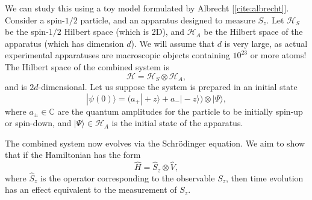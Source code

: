 \documentclass[pra,12pt]{revtex4-2}
\begin{document}
We can study this using a toy model formulated by Albrecht
[\ref{cite:albrecht}].  Consider a spin-$1/2$ particle, and an
apparatus designed to measure $S_z$.  Let $\mathscr{H}_S$ be the
spin-$1/2$ Hilbert space (which is 2D), and $\mathscr{H}_A$ be the
Hilbert space of the apparatus (which has dimension $d$).  We will
assume that $d$ is very large, as actual experimental apparatuses are
macroscopic objects containing $10^{23}$ or more atoms!  The Hilbert
space of the combined system is
\begin{equation}
  \mathscr{H} = \mathscr{H}_S \otimes \mathscr{H}_A,
\end{equation}
and is $2d$-dimensional.  Let us suppose the system is prepared in an initial
state
\begin{equation}
  |\psi(0)\rangle = \Big(a_+ |\!+z\rangle + a_- |\!-z\rangle\Big) \otimes |\Psi\rangle,
\end{equation}
where $a_\pm\in\mathbb{C}$ are the quantum amplitudes for the particle
to be initially spin-up or spin-down, and $|\Psi\rangle \in
\mathscr{H}_A$ is the initial state of the apparatus.

The combined system now evolves via the Schr\"odinger equation.  We
aim to show that if the Hamiltonian has the form
\begin{equation}
  \hat{H} = \hat{S}_z \otimes \hat{V},
\end{equation}
where $\hat{S}_z$ is the operator corresponding to the observable
$S_z$, then time evolution has an effect equivalent to the measurement
of $S_z$.
\end{document}
